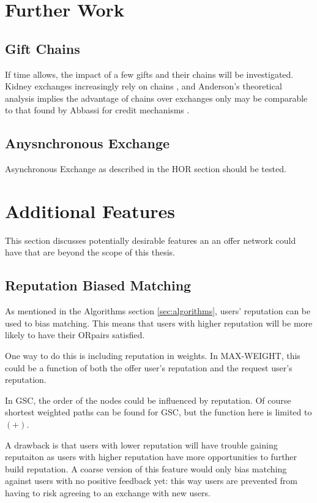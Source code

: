 \documentclass[main.tex]{subfiles}
\begin{document}
\section{Further Work}

\subsection{Gift Chains}

If time allows, the impact of a few gifts and their chains will be investigated. Kidney exchanges increasingly rely on chains \cite{Dick}, and Anderson's theoretical analysis \cite{And1} implies the advantage of chains over exchanges only may be comparable to that found by Abbassi for credit mechanisms \cite{Abb2}.

\subsection{Anysnchronous Exchange}
Asynchronous Exchange as described in the HOR section should be tested.


\section{Additional Features}
This section discusses potentially desirable features an an offer network could have that are beyond the scope of this thesis.

\subsection{Reputation Biased Matching}
As mentioned in the Algorithms section \ref{sec:algorithms}, users' reputation can be used to bias matching. This means that users with higher reputation will be more likely to have their ORpairs satisfied.

One way to do this is including reputation in weights. In MAX-WEIGHT, this could be a function of both the offer user's reputation and the request user's reputation.

In GSC, the order of the nodes could be influenced by reputation. Of course shortest weighted paths can be found for GSC, but the function here is limited to $(+)$.

A drawback is that users with lower reputation will have trouble gaining reputaiton as users with higher reputation have more opportunities to further build reputation. A coarse version of this feature would only bias matching against users with no positive feedback yet: this way users are prevented from having to risk agreeing to an exchange with new users.
\end{document}
